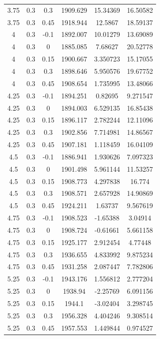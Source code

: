\begin{longtable}{|c|c|c|c|c|c|}
	3.75  & 0.3   & 0.3   & 1909.629 & 15.34369 & 16.50582 \\
	3.75  & 0.3   & 0.45  & 1918.944 & 12.5867 & 18.59137 \\
	4     & 0.3   & -0.1  & 1892.007 & 10.01279 & 13.69089 \\
	4     & 0.3   & 0     & 1885.085 & 7.68627 & 20.52778 \\
	4     & 0.3   & 0.15  & 1900.667 & 3.350723 & 15.17055 \\
	4     & 0.3   & 0.3   & 1898.646 & 5.950576 & 19.67752 \\
	4     & 0.3   & 0.45  & 1908.654 & 1.735995 & 13.48066 \\
	4.25  & 0.3   & -0.1  & 1894.251 & 0.82695 & 9.271547 \\
	4.25  & 0.3   & 0     & 1894.003 & 6.529135 & 16.85438 \\
	4.25  & 0.3   & 0.15  & 1896.117 & 2.782244 & 12.11096 \\
	4.25  & 0.3   & 0.3   & 1902.856 & 7.714981 & 14.86567 \\
	4.25  & 0.3   & 0.45  & 1907.181 & 1.118459 & 16.04109 \\
	4.5   & 0.3   & -0.1  & 1886.941 & 1.930626 & 7.097323 \\
	4.5   & 0.3   & 0     & 1901.498 & 5.961144 & 11.53257 \\
	4.5   & 0.3   & 0.15  & 1908.773 & 4.297838 & 16.774 \\
	4.5   & 0.3   & 0.3   & 1908.571 & 2.657928 & 14.90869 \\
	4.5   & 0.3   & 0.45  & 1924.211 & 1.63737 & 9.567619 \\
	4.75  & 0.3   & -0.1  & 1908.523 & -1.65388 & 3.04914 \\
	4.75  & 0.3   & 0     & 1908.724 & -0.61661 & 5.661158 \\
	4.75  & 0.3   & 0.15  & 1925.177 & 2.912454 & 4.77448 \\
	4.75  & 0.3   & 0.3   & 1936.655 & 4.833992 & 9.875234 \\
	4.75  & 0.3   & 0.45  & 1931.258 & 2.087447 & 7.782806 \\
	5.25  & 0.3   & -0.1  & 1943.176 & 1.556812 & 2.777204 \\
	5.25  & 0.3   & 0     & 1938.94 & -2.25769 & 6.091156 \\
	5.25  & 0.3   & 0.15  & 1944.1 & -3.02404 & 3.298745 \\
	5.25  & 0.3   & 0.3   & 1956.328 & 4.404246 & 9.308514 \\
	5.25  & 0.3   & 0.45  & 1957.553 & 1.449844 & 0.974527 \\

\end{longtable}
